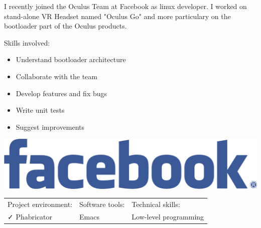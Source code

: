 \documentclass[letterpaper]{jm-cv} %
\begin{document}

\medskip
{}

\medskip
{}
\medskip

\small{


  I recently joined the Oculus Team at Facebook as linux developer.
  I worked on stand-alone VR Headset named "Oculus Go" and more particulary on the bootloader part of the Oculus products.

  \vspace{0.2cm}
  \begin{minipage}{.7\textwidth}
      {\footnotesize\color{maingray}\bullet} Skills involved:
  \begin{itemize}
  \item[\color{mainblue}\faArrowRight] Understand bootloader architecture
  \item[\color{mainblue}\faArrowRight] Collaborate with the team
  \item[\color{mainblue}\faArrowRight] Develop features and fix bugs
  \item[\color{mainblue}\faArrowRight] Write unit tests
  \item[\color{mainblue}\faArrowRight] Suggest improvements
  \end{itemize}
  \end{minipage}%
  \begin{minipage}{.3\textwidth}
    \center
    \includegraphics[scale=0.06]{logo-facebook.png}
  \end{minipage}
  \vspace{0.2cm}

  \begin{tabular}{ l l l }
    Project environment: & \hspace{1cm}Software tools: & \hspace{1cm}Technical skills:\\
    {\color{mainblue}\faCheck} Phabricator &
    \hspace{1cm}{\color{maingreen}\faCheck} Emacs &
    \hspace{1cm}{\color{maingray}\faCheck} Low-level programming\\


\end{tabular}}
\end{document}
